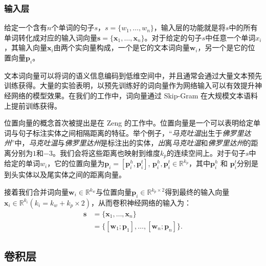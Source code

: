\subsubsection{输入层}
 
给定一个含有$n$个单词的句子$s$，$s = \{ w_1, \ldots , w_n\}$，输入层的功能就是将$s$中的所有单词转化成对应的输入词向量$\mathbf{s} = \{ \mathbf{x}_1, \ldots , \mathbf{x}_n \}$。对于给定的句子$s$中任意一个单词$x_i$，其输入向量$\mathbf{x}_i$由两个实向量构成，一个是它的文本词向量$\mathbf{w}_i$，另一个是它的位置向量$\mathbf{p}_{i}$。

文本词向量可以将词的语义信息编码到低维空间中，并且通常会通过大量文本预先训练获得。大量的实验表明，以预先训练好的词向量作为网络输入可以有效提升神经网络的模型效果。在我们的工作中，词向量通过 Skip-Gram \cite{mikolov2013efficient}在大规模文本语料上提前训练获得。

位置向量的概念首次被提出是在 Zeng \cite{zeng2014relation} 的工作中。位置向量是一个可以表明给定单词与句子标注实体之间相隔距离的特征。举个例子，``\emph{马克吐温}出生于\emph{佛罗里达州}''中，\emph{马克吐温}与\emph{佛罗里达州}是标注出的实体，\emph{出}离\emph{马克吐温}和\emph{佛罗里达州}的距离分别为$1$和$-3$。我们会将这些距离也映射到维度$k_p$的连续空间上。对于句子$s$中给定的单词$w_i$，它的位置向量为$\mathbf{p}_i = [\mathbf{p}^h_i, \mathbf{p}^t_i]$, $\mathbf{p}^h_i, \mathbf{p}^t_i \in \mathbb{R}^{k_p}$，其中$\mathbf{p}^h_i$ 和 $\mathbf{p}^t_i$分别是到头实体以及尾实体之间的距离向量。

接着我们合并词向量$\mathbf{w}_i \in \mathbb{R}^{k_w} $与位置向量$\mathbf{p}_i \in \mathbb{R}^{k_p \times 2} $得到最终的输入向量$\mathbf{x}_i \in \mathbb{R}^{k_i} (k_i = k_w + k_p \times 2)$，从而卷积神经网络的输入为：
\begin{align}
\mathbf{s} & = \{\mathbf{x}_1,\ldots, \mathbf{x}_n\} \\\nonumber
&=\{[\mathbf{w}_1;\mathbf{p}_1],\ldots, [\mathbf{w}_n;\mathbf{p}_n]\}.
\end{align}




\subsection{卷积层}

